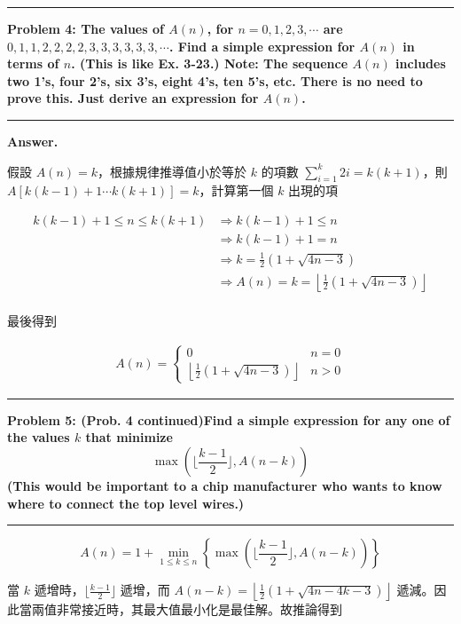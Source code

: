 \documentclass[11pt]{article}
\newcommand\question[2]{\vspace{.25in}\hrule\textbf{#1: #2}\vspace{.5em}\hrule\vspace{.10in}}
\renewcommand\part[1]{\vspace{.10in}\textbf{#1}}
\begin{document}
\question{Problem 4}{The values of $A(n)$, for $n = 0, 1, 2, 3, \cdots$ are $0, 1, 1, 2, 2, 2, 2, 3, 3, 3, 3, 3, 3, \cdots$. Find a simple expression for $A(n)$ in terms of $n$. (This is like Ex. 3-23.) Note: The sequence $A(n)$ includes two 1's, four 2's, six 3's, eight 4's, ten 5's, etc. There is no need to prove this. Just derive an expression for $A(n)$.
}

\part{Answer.}

假設 $A(n) = k$，根據規律推導值小於等於 $k$ 的項數 $\sum_{i=1}^{k} 2 i = k(k+1)$，則 $A[k(k-1)+1 \cdots k(k+1)] = k$，計算第一個 $k$ 出現的項  

\begin{align*}
k(k-1) +1 \le n \le k(k+1) &\Rightarrow k(k-1)+1 \le n \\
	&\Rightarrow k(k-1)+1 = n \\
	&\Rightarrow k = \frac{1}{2} (1 + \sqrt{4n - 3}) \\
	&\Rightarrow A(n) = k = \left \lfloor \frac{1}{2} (1 + \sqrt{4n - 3}) \right \rfloor \\
\end{align*}

最後得到

\begin{align*}
A(n) = \left\{\begin{matrix}
0 & n = 0\\
\left \lfloor \frac{1}{2} (1 + \sqrt{4n - 3}) \right \rfloor & n > 0
\end{matrix}\right.
\end{align*}

\question{Problem 5}{(Prob. 4 continued)Find a simple expression for any one of the values $k$ that minimize \begin{equation}
\max(\lfloor \frac{k-1}{2} \rfloor, A(n-k))
\end{equation} (This would be important to a chip manufacturer who wants to know where to connect the top level wires.)
}

\begin{equation}
A(n) = 1 + \min_{1 \le k \le n} \left \{ \max(\lfloor \frac{k-1}{2} \rfloor, A(n-k)) \right \}
\end{equation}

當 $k$ 遞增時，$\lfloor \frac{k-1}{2} \rfloor$ 遞增，而 $A(n-k) = \left \lfloor \frac{1}{2} (1 + \sqrt{4n - 4k - 3}) \right \rfloor$ 遞減。因此當兩值非常接近時，其最大值最小化是最佳解。故推論得到
\end{document}
